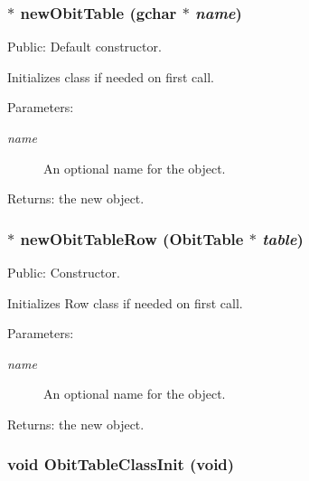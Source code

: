 \subsubsection{$\ast$ new\-Obit\-Table (gchar $\ast$ {\em name})}\label{ObitTable_8h_a29}


Public: Default constructor. 

Initializes class if needed on first call. \begin{Desc}
\item[Parameters:]
\begin{description}
\item[{\em name}]An optional name for the object. \end{description}
\end{Desc}
\begin{Desc}
\item[Returns:]the new object. \end{Desc}
\subsubsection{$\ast$ new\-Obit\-Table\-Row ({\bf Obit\-Table} $\ast$ {\em table})}\label{ObitTable_8h_a26}


Public: Constructor. 

Initializes Row class if needed on first call. \begin{Desc}
\item[Parameters:]
\begin{description}
\item[{\em name}]An optional name for the object. \end{description}
\end{Desc}
\begin{Desc}
\item[Returns:]the new object. \end{Desc}
\subsubsection{\setlength{\rightskip}{0pt plus 5cm}void Obit\-Table\-Class\-Init (void)}\label{ObitTable_8h_a28}


